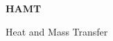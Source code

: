 \begin{titlepage}
	\begin{center}		
       \vspace*{2cm}
       \LARGE
       \textbf{HAMT}
       
       \vspace{0.5cm}
		\large       
       Heat and Mass Transfer
       
	\end{center}
	\large
	\vfill
	\noindent
\end{titlepage}
